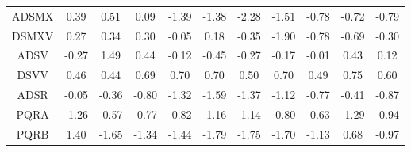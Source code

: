 \documentclass[11pt,a4paper]{report}
\begin{document}
\begin{longtable}{ | c || c | c | c | c | c | c | c | c | c || c |}
ADSMX &  \cellcolor[HTML]{F7F7FF} 0.39 &  \cellcolor[HTML]{EFEFFF} 0.51 &  \cellcolor[HTML]{FFFFFF} 0.09 &  \cellcolor[HTML]{FFDFDF} -1.39 &  \cellcolor[HTML]{FFDFDF} -1.38 &  \cellcolor[HTML]{FFC7C7} -2.28 &  \cellcolor[HTML]{FFD7D7} -1.51 &  \cellcolor[HTML]{FFEFEF} -0.78 &  \cellcolor[HTML]{FFEFEF} -0.72 &  \cellcolor[HTML]{FFEFEF} -0.79 \\
DSMXV &  \cellcolor[HTML]{F7F7FF} 0.27 &  \cellcolor[HTML]{F7F7FF} 0.34 &  \cellcolor[HTML]{F7F7FF} 0.30 &  \cellcolor[HTML]{FFFFFF} -0.05 &  \cellcolor[HTML]{F7F7FF} 0.18 &  \cellcolor[HTML]{FFF7F7} -0.35 &  \cellcolor[HTML]{FFCFCF} -1.90 &  \cellcolor[HTML]{FFEFEF} -0.78 &  \cellcolor[HTML]{FFEFEF} -0.69 &  \cellcolor[HTML]{FFF7F7} -0.30 \\
ADSV &  \cellcolor[HTML]{FFF7F7} -0.27 &  \cellcolor[HTML]{D7D7FF} 1.49 &  \cellcolor[HTML]{F7F7FF} 0.44 &  \cellcolor[HTML]{FFFFFF} -0.12 &  \cellcolor[HTML]{FFF7F7} -0.45 &  \cellcolor[HTML]{FFF7F7} -0.27 &  \cellcolor[HTML]{FFF7F7} -0.17 &  \cellcolor[HTML]{FFFFFF} -0.01 &  \cellcolor[HTML]{F7F7FF} 0.43 &  \cellcolor[HTML]{FFFFFF} 0.12 \\
DSVV &  \cellcolor[HTML]{F7F7FF} 0.46 &  \cellcolor[HTML]{F7F7FF} 0.44 &  \cellcolor[HTML]{EFEFFF} 0.69 &  \cellcolor[HTML]{EFEFFF} 0.70 &  \cellcolor[HTML]{EFEFFF} 0.70 &  \cellcolor[HTML]{EFEFFF} 0.50 &  \cellcolor[HTML]{EFEFFF} 0.70 &  \cellcolor[HTML]{EFEFFF} 0.49 &  \cellcolor[HTML]{EFEFFF} 0.75 &  \cellcolor[HTML]{EFEFFF} 0.60 \\
ADSR &  \cellcolor[HTML]{FFFFFF} -0.05 &  \cellcolor[HTML]{FFF7F7} -0.36 &  \cellcolor[HTML]{FFE7E7} -0.80 &  \cellcolor[HTML]{FFDFDF} -1.32 &  \cellcolor[HTML]{FFD7D7} -1.59 &  \cellcolor[HTML]{FFDFDF} -1.37 &  \cellcolor[HTML]{FFDFDF} -1.12 &  \cellcolor[HTML]{FFEFEF} -0.77 &  \cellcolor[HTML]{FFF7F7} -0.41 &  \cellcolor[HTML]{FFE7E7} -0.87 \\
PQRA &  \cellcolor[HTML]{FFDFDF} -1.26 &  \cellcolor[HTML]{FFEFEF} -0.57 &  \cellcolor[HTML]{FFEFEF} -0.77 &  \cellcolor[HTML]{FFE7E7} -0.82 &  \cellcolor[HTML]{FFDFDF} -1.16 &  \cellcolor[HTML]{FFDFDF} -1.14 &  \cellcolor[HTML]{FFE7E7} -0.80 &  \cellcolor[HTML]{FFEFEF} -0.63 &  \cellcolor[HTML]{FFDFDF} -1.29 &  \cellcolor[HTML]{FFE7E7} -0.94 \\
PQRB &  \cellcolor[HTML]{DFDFFF} 1.40 &  \cellcolor[HTML]{FFD7D7} -1.65 &  \cellcolor[HTML]{FFDFDF} -1.34 &  \cellcolor[HTML]{FFD7D7} -1.44 &  \cellcolor[HTML]{FFCFCF} -1.79 &  \cellcolor[HTML]{FFCFCF} -1.75 &  \cellcolor[HTML]{FFD7D7} -1.70 &  \cellcolor[HTML]{FFDFDF} -1.13 &  \cellcolor[HTML]{EFEFFF} 0.68 &  \cellcolor[HTML]{FFE7E7} -0.97 \\

\end{longtable}
\end{document}
